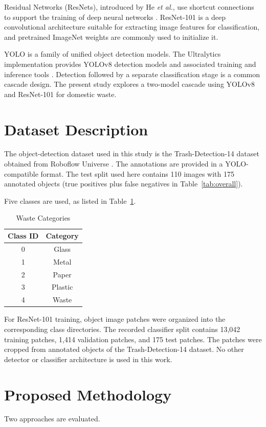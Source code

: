 \documentclass[conference]{IEEEtran}
\begin{document}
Residual Networks (ResNets), introduced by He \textit{et al.}, use shortcut connections to support the training of deep neural networks \cite{he2016resnet}. ResNet-101 is a deep convolutional architecture suitable for extracting image features for classification, and pretrained ImageNet weights \cite{deng2009imagenet} are commonly used to initialize it.

YOLO is a family of unified object detection models. The Ultralytics implementation provides YOLOv8 detection models and associated training and inference tools \cite{jocher2023yolov8,ultralytics}. Detection followed by a separate classification stage is a common cascade design. The present study explores a two-model cascade using YOLOv8 and ResNet-101 for domestic waste.

\section{Dataset Description}
The object-detection dataset used in this study is the Trash-Detection-14 dataset obtained from Roboflow Universe \cite{roboflow}. The annotations are provided in a YOLO-compatible format. The test split used here contains 110 images with 175 annotated objects (true positives plus false negatives in Table~\ref{tab:overall}).

Five classes are used, as listed in Table~\ref{tab:classes}.
\begin{table}[htbp]
\caption{Waste Categories}
\label{tab:classes}
\centering
\begin{tabular}{cc}
\toprule
\textbf{Class ID} & \textbf{Category}\\
\midrule
0 & Glass\\
1 & Metal\\
2 & Paper\\
3 & Plastic\\
4 & Waste\\
\bottomrule
\end{tabular}
\end{table}

For ResNet-101 training, object image patches were organized into the corresponding class directories. The recorded classifier split contains 13,042 training patches, 1,414 validation patches, and 175 test patches. The patches were cropped from annotated objects of the Trash-Detection-14 dataset. No other detector or classifier architecture is used in this work.

\section{Proposed Methodology}
Two approaches are evaluated.
\end{document}
